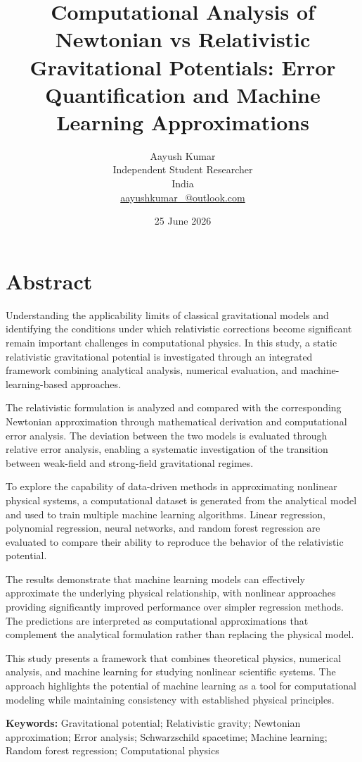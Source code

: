 \documentclass[
]{article}
\title{\textbf{Computational Analysis of Newtonian vs Relativistic Gravitational Potentials: Error Quantification and Machine Learning Approximations}}
\author{
Aayush Kumar\\
Independent Student Researcher\\
India\\
\href{mailto:aayushkumar_@outlook.com}{aayushkumar\_@outlook.com}
}
\date{25 June 2026}
\begin{document}
\maketitle
\section{Abstract}\label{abstract}
Understanding the applicability limits of classical gravitational models
and identifying the conditions under which relativistic corrections become
significant remain important challenges in computational physics. In this
study, a static relativistic gravitational potential is investigated
through an integrated framework combining analytical analysis, numerical
evaluation, and machine-learning-based approaches.

The relativistic formulation is analyzed and compared with the
corresponding Newtonian approximation through mathematical derivation
and computational error analysis. The deviation between the two models
is evaluated through relative error analysis, enabling a systematic
investigation of the transition between weak-field and strong-field
gravitational regimes.

To explore the capability of data-driven methods in approximating
nonlinear physical systems, a computational dataset is generated from
the analytical model and used to train multiple machine learning
algorithms. Linear regression, polynomial regression, neural networks,
and random forest regression are evaluated to compare their ability to
reproduce the behavior of the relativistic potential.

The results demonstrate that machine learning models can effectively
approximate the underlying physical relationship, with nonlinear
approaches providing significantly improved performance over simpler
regression methods. The predictions are interpreted as computational
approximations that complement the analytical formulation rather than
replacing the physical model.

This study presents a framework that combines theoretical physics,
numerical analysis, and machine learning for studying nonlinear
scientific systems. The approach highlights the potential of machine
learning as a tool for computational modeling while maintaining
consistency with established physical principles.

\noindent\textbf{Keywords:}
Gravitational potential;
Relativistic gravity;
Newtonian approximation;
Error analysis;
Schwarzschild spacetime;
Machine learning;
Random forest regression;
Computational physics
\end{document}
